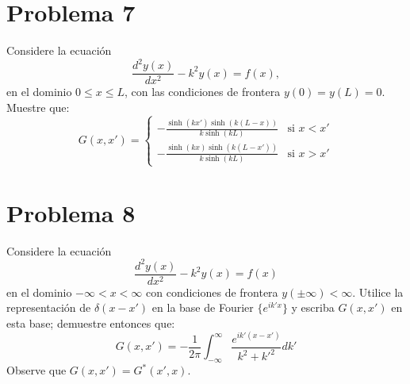 \documentclass[a4paper]{article}
\begin{document}
\section{Problema 7}
Considere la ecuación $$ \frac{d^2y(x)}{dx^2} - k^2 y(x) = f(x), $$ en el dominio $0 \le x \le L$, con las condiciones de frontera $y(0) = y(L) = 0$. Muestre que:
$$ G(x, x') = \begin{cases} -\frac{\sinh(kx') \sinh(k(L-x))}{k \sinh(kL)} & \text{si } x < x' \\ -\frac{\sinh(kx) \sinh(k(L-x'))}{k \sinh(kL)} & \text{si } x > x' \end{cases} $$

\section{Problema 8}
Considere la ecuación $$ \frac{d^2y(x)}{dx^2} - k^2 y(x) = f(x) $$ en el dominio $-\infty < x < \infty$ con condiciones de frontera $y(\pm\infty) < \infty$. Utilice la representación de $\delta(x-x')$ en la base de Fourier $\{e^{ik'x}\}$ y escriba $G(x, x')$ en esta base; demuestre entonces que:
$$ G(x, x') = -\frac{1}{2\pi} \int_{-\infty}^{\infty} \frac{e^{ik'(x-x')}}{k^2 + k'^2} dk' $$
Observe que $G(x, x') = G^*(x', x)$.



 
\end{document}
